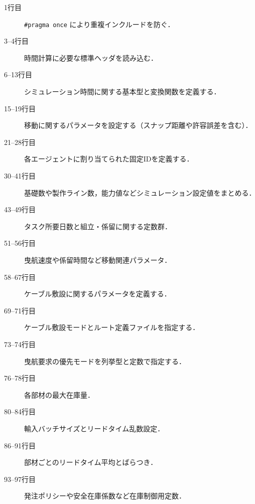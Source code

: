 \documentclass[10pt,letterpaper]{jsarticle}
\begin{document}
\begin{description}
  \item[1行目] \lstinline|#pragma once| により重複インクルードを防ぐ．
  \item[3--4行目] 時間計算に必要な標準ヘッダを読み込む．
  \item[6--13行目] シミュレーション時間に関する基本型と変換関数を定義する．
  \item[15--19行目] 移動に関するパラメータを設定する（スナップ距離や許容誤差を含む）．
  \item[21--28行目] 各エージェントに割り当てられた固定IDを定義する．
  \item[30--41行目] 基礎数や製作ライン数，能力値などシミュレーション設定値をまとめる．
  \item[43--49行目] タスク所要日数と組立・係留に関する定数群．
  \item[51--56行目] 曳航速度や係留時間など移動関連パラメータ．
  \item[58--67行目] ケーブル敷設に関するパラメータを定義する．
  \item[69--71行目] ケーブル敷設モードとルート定義ファイルを指定する．
  \item[73--74行目] 曳航要求の優先モードを列挙型と定数で指定する．
  \item[76--78行目] 各部材の最大在庫量．
  \item[80--84行目] 輸入バッチサイズとリードタイム乱数設定．
  \item[86--91行目] 部材ごとのリードタイム平均とばらつき．
  \item[93--97行目] 発注ポリシーや安全在庫係数など在庫制御用定数．
\end{description}
\end{document}

